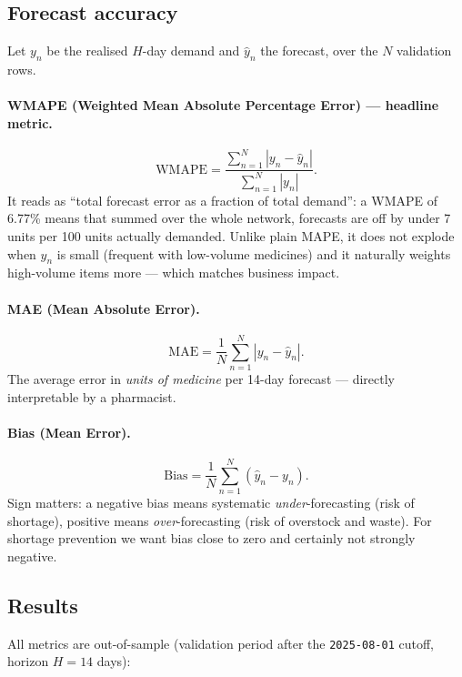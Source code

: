 \documentclass[11pt,a4paper]{article}
\begin{document}
\subsection{Forecast accuracy}
Let $y_n$ be the realised $H$-day demand and $\hat{y}_n$ the forecast, over the $N$ validation rows.

\paragraph{WMAPE (Weighted Mean Absolute Percentage Error) --- headline metric.}
\begin{equation}
\mathrm{WMAPE} = \frac{\sum_{n=1}^{N} |y_n - \hat{y}_n|}{\sum_{n=1}^{N} |y_n|}.
\end{equation}
It reads as ``total forecast error as a fraction of total demand'': a WMAPE of 6.77\% means that summed over the whole network, forecasts are off by under 7 units per 100 units actually demanded. Unlike plain MAPE, it does not explode when $y_n$ is small (frequent with low-volume medicines) and it naturally weights high-volume items more --- which matches business impact.

\paragraph{MAE (Mean Absolute Error).}
\begin{equation}
\mathrm{MAE} = \frac{1}{N}\sum_{n=1}^{N} |y_n - \hat{y}_n|.
\end{equation}
The average error in \emph{units of medicine} per 14-day forecast --- directly interpretable by a pharmacist.

\paragraph{Bias (Mean Error).}
\begin{equation}
\mathrm{Bias} = \frac{1}{N}\sum_{n=1}^{N} (\hat{y}_n - y_n).
\end{equation}
Sign matters: a negative bias means systematic \emph{under}-forecasting (risk of shortage), positive means \emph{over}-forecasting (risk of overstock and waste). For shortage prevention we want bias close to zero and certainly not strongly negative.

\subsection{Results}
All metrics are out-of-sample (validation period after the \texttt{2025-08-01} cutoff, horizon $H = 14$ days):
\end{document}
